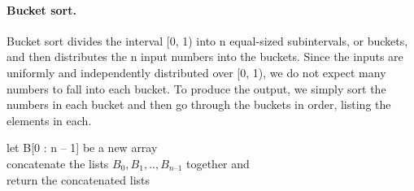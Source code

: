 \newpage

\paragraph{Bucket sort.} %
Bucket sort divides the interval [0, 1) into n equal-sized subintervals, or buckets, and then distributes the n input numbers into the buckets. Since the inputs are uniformly and independently distributed over [0, 1), we do not expect many numbers to fall into each bucket. To produce the output, we simply sort the numbers in each bucket and then go through the buckets in order, listing the elements in each.

  \begin{algorithm}
    	let B[0 : n – 1] be a new array \\
	\For{ $i \leftarrow [1, n]$}{
	    insert $A_{i}$ into list $B_{ \lfloor n A_{i} \rfloor} ]$
       	}
	concatenate the lists $B_{0}, B_{1}, .. , B_{n – 1}$ together and\\
	return the concatenated lists
\caption{bucket-sort($A$, $n$)}
  \end{algorithm}



